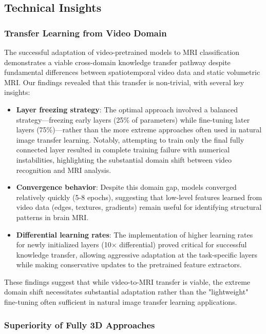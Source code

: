 \documentclass[12pt, a4paper]{article}
\begin{document}
\subsection{Technical Insights}

\subsubsection{Transfer Learning from Video Domain}

The successful adaptation of video-pretrained models to MRI classification demonstrates a viable cross-domain knowledge transfer pathway despite fundamental differences between spatiotemporal video data and static volumetric MRI. Our findings revealed that this transfer is non-trivial, with several key insights:

\begin{itemize}
    \item \textbf{Layer freezing strategy}: The optimal approach involved a balanced strategy—freezing early layers (25\% of parameters) while fine-tuning later layers (75\%)—rather than the more extreme approaches often used in natural image transfer learning. Notably, attempting to train only the final fully connected layer resulted in complete training failure with numerical instabilities, highlighting the substantial domain shift between video recognition and MRI analysis.
    
    \item \textbf{Convergence behavior}: Despite this domain gap, models converged relatively quickly (5-8 epochs), suggesting that low-level features learned from video data (edges, textures, gradients) remain useful for identifying structural patterns in brain MRI.
    
    \item \textbf{Differential learning rates}: The implementation of higher learning rates for newly initialized layers (10× differential) proved critical for successful knowledge transfer, allowing aggressive adaptation at the task-specific layers while making conservative updates to the pretrained feature extractors.
\end{itemize}

These findings suggest that while video-to-MRI transfer is viable, the extreme domain shift necessitates substantial adaptation rather than the "lightweight" fine-tuning often sufficient in natural image transfer learning applications.

\subsubsection{Superiority of Fully 3D Approaches}
\end{document}
